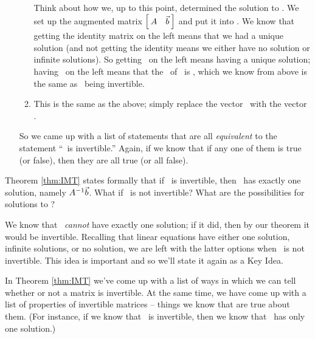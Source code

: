 \begin{enumerate}
\begin{enumerate}
	Think about how we, up to this point, determined the solution to \ttaxb. We set up the augmented matrix $\bmx{cc} \tta & \vb \emx$ and put it into \rref. We know that getting the identity matrix on the left means that we had a unique solution (and not getting the identity means we either have no solution or infinite solutions). So getting \tti\ on the left means having a unique solution; having \tti\ on the left means that the \rref\ of \tta\ is \tti, which we know from above is the same as \tta\ being invertible.
	\item		This is the same as the above; simply replace the vector \vb\ with the vector \zero.	
	\end{enumerate}

So we came up with a list of statements that are all {\em equivalent} to the statement ``\tta\ is invertible.'' Again, if we know that if any one of them is true (or false), then they are all true (or all false).
\end{enumerate}

Theorem \ref{thm:IMT} states formally that if \tta\ is invertible, then \ttaxb\ has exactly one solution, namely $\ttai\vb$. What if \tta\ is not invertible? What are the possibilities for solutions to \ttaxb? 

We know that \ttaxb\ \textit{cannot} have exactly one solution; if it did, then by our theorem it would be invertible. Recalling that linear equations have either one solution, infinite solutions, or no solution, we are left with the latter options when \tta\ is not invertible. This idea is important and so we'll state it again as a Key Idea.


In Theorem \ref{thm:IMT} we've come up with a list of ways in which we can tell whether or not a matrix is invertible. At the same time, we have come up with a list of properties of invertible matrices -- things we know that are true about them. (For instance, if we know that \tta\ is invertible, then we know that \ttaxb\ has only one solution.) 

